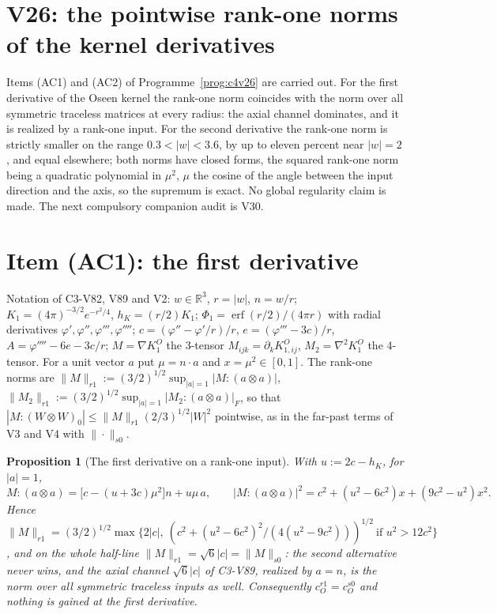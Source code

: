 \documentclass[11pt]{article}
\theoremstyle{plain}
\newtheorem{proposition}[theorem]{Proposition}
\theoremstyle{definition}
\theoremstyle{remark}
\begin{document}
\section{V26: the pointwise rank-one norms of the kernel derivatives}
\label{sec:c4v26-entry}

Items (AC1) and (AC2) of Programme~\ref{prog:c4v26} are carried out.
For the first derivative of the Oseen kernel the rank-one norm
coincides with the norm over all symmetric traceless matrices at
every radius: the axial channel dominates, and it is realized by a
rank-one input.  For the second derivative the rank-one norm is
strictly smaller on the range \(0.3<|w|<3.6\), by up to eleven percent
near \(|w|=2\), and equal elsewhere; both norms have closed forms, the
squared rank-one norm being a quadratic polynomial in \(\mu^2\), \(\mu\) the
cosine of the angle between the input direction and the axis, so
the supremum is exact.  No global regularity claim is made.  The
next compulsory companion audit is V30.

\section{Item (AC1): the first derivative}
\label{sec:c4v26-first}

Notation of C3-V82, V89 and V2: \(w\in\mathbb R^3\), \(r=|w|\), \(n=w/r\); \(K_1=(4\pi)^{-3/2}e^{-r^2/4}\),
\(h_K=(r/2)K_1\); \(\Phi_1=\operatorname{erf}(r/2)/(4\pi r)\) with radial derivatives \(\varphi',\varphi'',\varphi''',\varphi''''\);
\(c=(\varphi''-\varphi'/r)/r\), \(e=(\varphi'''-3c)/r\), \(A=\varphi''''-6e-3c/r\); \(M=\nabla K^O_1\) the 3-tensor
\(M_{ijk}=\partial_kK^O_{1,ij}\), \(M_2=\nabla^2K^O_1\) the 4-tensor.  For a unit vector \(a\) put \(\mu=n\cdot a\)
and \(x=\mu^2\in[0,1]\).  The rank-one norms are
\(\|M\|_{r1}:=(3/2)^{1/2}\sup_{|a|=1}|M:(a\otimes a)|\), \(\|M_2\|_{r1}:=(3/2)^{1/2}\sup_{|a|=1}|M_2:(a\otimes a)|_F\), so that
\(|M:(W\otimes W)_0|\le\|M\|_{r1}(2/3)^{1/2}|W|^2\) pointwise, as in the far-past terms of V3
and V4 with \(\|\cdot\|_{s0}\).

\begin{proposition}[The first derivative on a rank-one input]
\label{prop:c4v26-first}
With \(u:=2c-h_K\), for \(|a|=1\),
\begin{equation}
 M:(a\otimes a)=\bigl[c-(u+3c)\mu^2\bigr]n+u\mu\,a,\qquad
 |M:(a\otimes a)|^2=c^2+(u^2-6c^2)x+(9c^2-u^2)x^2 .
 \label{eq:c4v26-first}
\end{equation}
Hence \(\|M\|_{r1}=(3/2)^{1/2}\max\{2|c|,\ (c^2+(u^2-6c^2)^2/(4(u^2-9c^2)))^{1/2}\ \text{if }u^2>12c^2\}\), and on the
whole half-line \(\|M\|_{r1}=\sqrt6|c|=\|M\|_{s0}\): the second alternative never
wins, and the axial channel \(\sqrt6|c|\) of C3-V89, realized by \(a=n\), is the
norm over all symmetric traceless inputs as well.  Consequently
\(c_O^{r1}=c_O^{s0}\) and nothing is gained at the first derivative.
\end{proposition}
\end{document}
